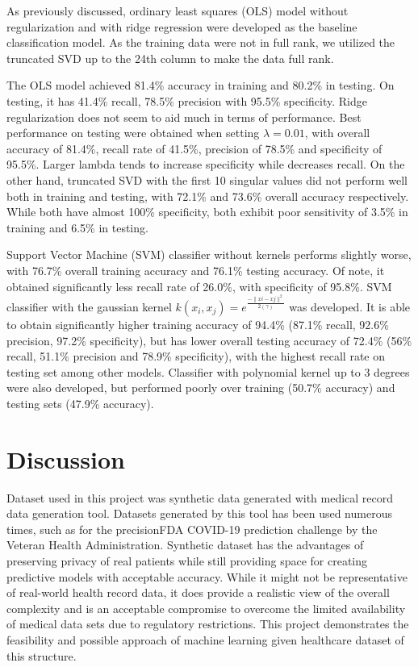 \documentclass{article}
\begin{document}
As previously discussed, ordinary least squares (OLS) model without regularization and with ridge regression were developed as the baseline classification model. As the training data were not in full rank, we utilized the truncated SVD up to the 24th column to make the data full rank.

The OLS model achieved 81.4\% accuracy in training and 80.2\% in testing. On testing, it has 41.4\% recall, 78.5\% precision with 95.5\% specificity. Ridge regularization does not seem to aid much in terms of performance. Best performance on testing were obtained when setting $\lambda = 0.01$, with overall accuracy of 81.4\%, recall rate of 41.5\%, precision of 78.5\% and specificity of 95.5\%. Larger lambda tends to increase specificity while decreases recall. On the other hand, truncated SVD with the first 10 singular values did not perform well both in training and testing, with 72.1\% and 73.6\% overall accuracy respectively.  While both have almost 100\% specificity, both exhibit poor sensitivity of 3.5\% in training and 6.5\% in testing.

Support Vector Machine (SVM) classifier without kernels performs slightly worse, with 76.7\% overall training accuracy and 76.1\% testing accuracy. Of note, it obtained significantly less recall rate of 26.0\%, with specificity of 95.8\%. SVM classifier with the gaussian kernel $k(x_i, x_j) = e^{\frac{-\|xi - xj\|^2}{2 (\gamma)}}$ was developed. It is able to obtain significantly higher training accuracy of 94.4\% (87.1\% recall, 92.6\% precision, 97.2\% specificity), but has lower overall testing accuracy of 72.4\% (56\% recall, 51.1\% precision and 78.9\% specificity), with the highest recall rate on testing set among other models. Classifier with polynomial kernel up to 3 degrees were also developed, but performed poorly over training (50.7\% accuracy) and testing sets (47.9\% accuracy).

\section{Discussion}
\label{discussion}

Dataset used in this project was synthetic data generated with medical record data generation tool. Datasets generated by this tool has been used numerous times, such as for the precisionFDA COVID-19 prediction challenge by the Veteran Health Administration.\cite{VHA} Synthetic dataset has the advantages of preserving privacy of real patients while still providing space for creating predictive models with acceptable accuracy.\cite{foraker} While it might not be representative of real-world health record data, it does provide a realistic view of the overall complexity and is an acceptable compromise to overcome the limited availability of medical data sets due to regulatory restrictions. This project demonstrates the feasibility and possible approach of machine learning given healthcare dataset of this structure. 
\end{document}
